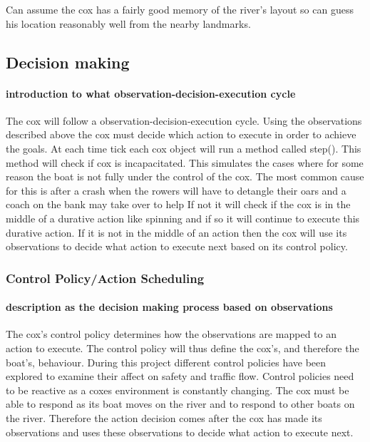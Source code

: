       Can assume the cox has a fairly good memory of the river's layout so can guess his location reasonably well from the nearby landmarks.
  
      \subsection{Decision making}
      \paragraph{introduction to what observation-decision-execution cycle}
      The cox will follow a observation-decision-execution cycle. Using the observations described above the cox must decide which action to execute in order to achieve the goals. At each time tick each cox object will run a method called step(). This method will check if cox is incapacitated. This simulates the cases where for some reason the boat is not fully under the control of the cox. The most common cause for this is after a crash when the rowers will have to detangle their oars and a coach on the bank may take over to help If not it will check if the cox is in the middle of a durative action like spinning and if so it will continue to execute this durative action. If it is not in the middle of an action then the cox will use its observations to decide what action to execute next based on its control policy.
      
      \subsubsection{Control Policy/Action Scheduling}
      \paragraph{description as the decision making process based on observations}
      The cox's control policy determines how the observations are mapped to an action to execute. The control policy will thus define the cox's, and therefore the boat's, behaviour. During this project different control policies have been explored to examine their affect on safety and traffic flow. Control policies need to be reactive as a coxes environment is constantly changing. The cox must be able to respond as its boat moves on the river and to respond to other boats on the river. Therefore the action decision comes after the cox has made its observations and uses these observations to decide what action to execute next.
      
